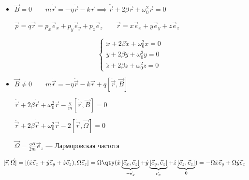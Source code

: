 \begin{figure}[H]
\end{figure}

\begin{itemize}
	\item $\vec{B} = 0 \qquad m\ddot{\vec{r}} = -\eta\dot{\vec{r}} - k\vec{r} \implies \ddot{\vec{r}} + 2\beta\dot{\vec{r}} + \omega_0^2\vec{r} = 0$
	
	$\vec{p} = q\vec{r} = p_x\vec{e}_x + p_y\vec{e}_y + p_z\vec{e}_z \qquad \vec{r} = x\vec{e}_x + y\vec{e}_y + z\vec{e}_z$
	
	\begin{equation*}
		\begin{cases}
			\ddot{x} + 2\beta\dot{x} + \omega_0^2 x = 0 \\
			\ddot{y} + 2\beta\dot{y} + \omega_0^2 y = 0 \\
			\ddot{z} + 2\beta\dot{z} + \omega_0^2 z = 0
		\end{cases}
	\end{equation*}
	
	\item $\vec{B} \neq 0 \qquad m\ddot{\vec{r}} = -\eta\dot{\vec{r}} - k\vec{r} + q[\dot{\vec{r}}, \vec{B}]$
	
	$\ddot{\vec{r}} + 2\beta\dot{\vec{r}} + \omega_0^2\vec{r} - \frac{q}{m}[\dot{\vec{r}}, \vec{B}] = 0$
	
	$\ddot{\vec{r}} + 2\beta\dot{\vec{r}} + \omega_0^2\vec{r} - 2[\dot{\vec{r}}, \vec{\Omega}] = 0$
	
	\colorbox{orange!30}{$\vec{\Omega} = \frac{qB}{2m} \vec{e}_z \text{ --- Ларморовская частота}$}
\end{itemize}

$[\dot{\vec{r}}, \vec{\Omega}] = [(\dot{x}\vec{e}_x + \dot{y}\vec{e}_y + \dot{z}\vec{e}_z), \Omega\vec{e}_z] = \Omega\qty( \dot{x}\underbrace{[\vec{e}_x, \vec{e}_z]}_{-\vec{e}_y} + \dot{y}\underbrace{[\vec{e}_y, \vec{e}_z]}_{\vec{e}_x} + \dot{z}\underbrace{[\vec{e}_z, \vec{e}_z]}_{0} ) = -\Omega\dot{x}\vec{e}_y + \Omega\dot{y}\vec{e}_x$

